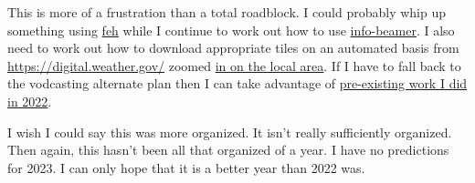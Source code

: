 This is more of a frustration than a total roadblock. I could probably
whip up something using \href{https://feh.finalrewind.org/}{feh} while I
continue to work out how to use
\href{https://github.com/info-beamer}{info-beamer}. I also need to work
out how to download appropriate tiles on an automated basis from
\url{https://digital.weather.gov/} zoomed
\href{https://digital.weather.gov/?zoom=8&lat=41.3043&lon=-80.55885&layers=F000BTTTTTT&region=0&element=4&mxmz=false&barbs=true&subl=TTTTF&units=english&wunits=nautical&coords=latlon&tunits=localt}{in
on the local area}. If I have to fall back to the vodcasting alternate
plan then I can take advantage of
\href{https://coyote.works/howtouse.html}{pre-existing work I did in
2022}.

I wish I could say this was more organized. It isn't really sufficiently
organized. Then again, this hasn't been all that organized of a year. I
have no predictions for 2023. I can only hope that it is a better year
than 2022 was.
